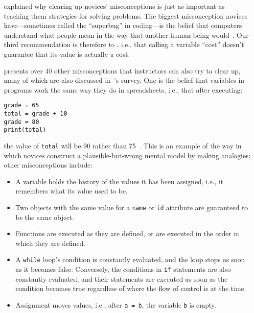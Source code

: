 
 explained why clearing up novices' misconceptions
is just as important as teaching them strategies for solving problems.
The biggest misconception novices have---sometimes called the ``superbug'' in coding---is
the belief that computers understand what people mean in the way that another human being would~\cite{Pea1986}.
Our third recommendation is therefore to ,
i.e.,
that calling a variable ``cost'' doesn't guarantee that its value is actually a cost.

\cite{Sorv2018} presents over 40 other misconceptions that instructors can also try to clear up,
many of which are also discussed in~\cite{Qian2017}'s survey.
One is the belief that variables in programs work the same way they do in spreadsheets,
i.e.,
that after executing:

\begin{verbatim}
grade = 65
total = grade + 10
grade = 80
print(total)
\end{verbatim}

\noindent
the value of \texttt{total} will be 90 rather than 75~\cite{Kohn2017}.
This is an example of the way in which novices construct a plausible-but-wrong mental model by making analogies;
other misconceptions include:

\begin{itemize}

\item
  A variable holds the history of the values it has been assigned,
  i.e., it remembers what its value used to be.

\item
  Two objects with the same value for a \texttt{name} or \texttt{id} attribute
  are guaranteed to be the same object.

\item
  Functions are executed as they are defined,
  or are executed in the order in which they are defined.

\item
  A \texttt{while} loop's condition is constantly evaluated,
  and the loop stops as soon as it becomes false.
  Conversely,
  the conditions in \texttt{if} statements are also constantly evaluated,
  and their statements are executed as soon as the condition becomes true
  regardless of where the flow of control is at the time.

\item
  Assignment moves values,
  i.e.,
  after \texttt{a\ =\ b}, the variable \texttt{b} is empty.

\end{itemize}


